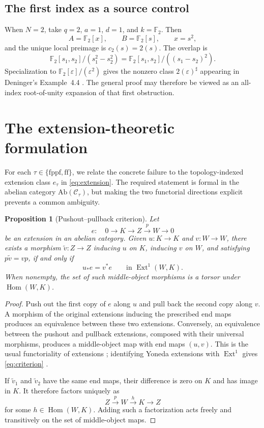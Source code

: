 \documentclass[11pt]{article}
\newtheorem{proposition}[theorem]{Proposition}
\theoremstyle{definition}
\newcommand{\Ext}{\operatorname{Ext}}
\newcommand{\Hom}{\operatorname{Hom}}
\newcommand{\sh}{\sharp}
\newcommand{\ff}{\mathrm{ff}}
\newcommand{\fppf}{\mathrm{fppf}}
\begin{document}
\subsection{The first index as a source control}

When \(N=2\), take \(q=2\), \(a=1\), \(d=1\), and \(k=\mathbb F_2\).
Then
\[
 A=\mathbb F_2[x],\qquad B=\mathbb F_2[s],\qquad x=s^2,
\]
and the unique local preimage is \(c_2(s)=2(s)\).  The overlap is
\[
 \mathbb F_2[s_1,s_2]/(s_1^2-s_2^2)
  =\mathbb F_2[s_1,s_2]/((s_1-s_2)^2).
\]
Specialization to
\(\mathbb F_2[\varepsilon]/(\varepsilon^2)\) gives the nonzero class
\(2(\varepsilon)^\sh\) appearing in
Deninger's Example~4.4 \cite[p.~22]{Deninger2025Rational}.  The general
proof may therefore be viewed as an all-index root-of-unity expansion of
that first obstruction.

\section{The extension-theoretic formulation}\label{sec:ext}

For each \(\tau\in\{\fppf,\ff\}\), we relate the concrete failure to the
topology-indexed extension class \(e_\tau\) in
\eqref{eq:extension}.  The required statement is formal in the abelian
category \(\mathrm{Ab}(\mathscr C_\tau)\), but making the two functorial
directions explicit prevents a common ambiguity.

\begin{proposition}[Pushout--pullback criterion]\label{prop:extcriterion}
Let
\[
 e:\quad0\longrightarrow K\longrightarrow Z
   \xrightarrow{p}W\longrightarrow0
\]
be an extension in an abelian category.  Given
\(u\colon K\to K\) and \(v\colon W\to W\), there exists a morphism
\(\widetilde v\colon Z\to Z\) inducing \(u\) on \(K\), inducing \(v\) on
\(W\), and satisfying \(p\widetilde v=vp\), if and only if
\[
 u_*e=v^*e\qquad\text{in }\Ext^1(W,K).
 \tag{5.1}\label{eq:criterion}
\]
When nonempty, the set of such middle-object morphisms is a torsor under
\(\Hom(W,K)\).
\end{proposition}

\begin{proof}
Push out the first copy of \(e\) along \(u\) and pull back the second copy
along \(v\).  A morphism of the original extensions inducing the prescribed
end maps produces an equivalence between these two extensions.  Conversely,
an equivalence between the pushout and pullback extensions, composed with
their universal morphisms, produces a middle-object map with end maps
\((u,v)\).  This is the usual functoriality of extensions
\cite[Tag 010I]{StacksProject}; identifying Yoneda extensions with
\(\Ext^1\) gives \eqref{eq:criterion}
\cite[Tag 06XP]{StacksProject}.

If \(\widetilde v_1\) and \(\widetilde v_2\) have the same end maps, their
difference is zero on \(K\) and has image in \(K\).  It therefore factors
uniquely as
\[
 Z\xrightarrow{p}W\xrightarrow{h}K\longrightarrow Z
\]
for some \(h\in\Hom(W,K)\).  Adding such a factorization acts freely and
transitively on the set of middle-object maps.
\end{proof}
\end{document}
